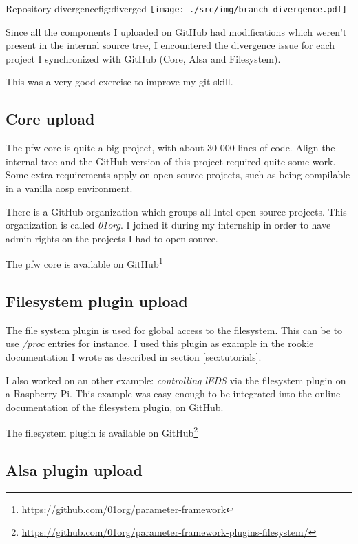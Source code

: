 \begin{figureGraphics}{Repository divergence}{fig:diverged}
    \texttt{[image: ./src/img/branch-divergence.pdf]}
\end{figureGraphics}
Since all the components I uploaded on \gls{GitHub} had modifications which weren't present
in the internal source tree, I encountered the divergence issue for each project I
synchronized with \gls{GitHub} (Core, Alsa and Filesystem).

This was a very good exercise to improve my \gls{git} skill.

\subsection{Core upload}
The \gls{pfw} core is quite a big project, with about 30 000 lines of code.
Align the internal tree and the \gls{GitHub} version of this project required quite some work.
Some extra requirements apply on open-source projects, such as being compilable in a vanilla \gls{aosp} environment.

There is a \gls{GitHub} organization which groups all Intel open-source projects. This
organization is called \emph{01org}. I joined it during my internship in order to have admin rights
on the projects I had to open-source.

The \gls{pfw} core is available on \gls{GitHub}\footnote{\url{https://github.com/01org/parameter-framework}}

\subsection{Filesystem plugin upload}

The file system plugin is used for global access to the filesystem. This can be to
use \emph{/proc} entries for instance. I used this plugin as example in the rookie
documentation I wrote as described in section \ref{sec:tutorials}.

I also worked on an other example: \emph{controlling lEDS} via the filesystem
plugin on a Raspberry Pi.  This example was easy enough to be integrated into
the online documentation of the filesystem plugin, on \gls{GitHub}.

The filesystem plugin is available on \gls{GitHub}\footnote{\url{https://github.com/01org/parameter-framework-plugins-filesystem/}}

\subsection{Alsa plugin upload}

